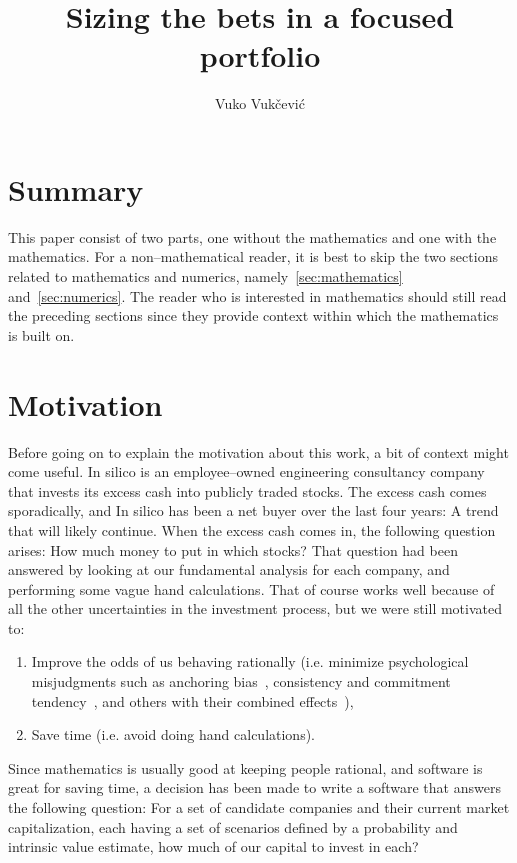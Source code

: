 \documentclass{article}
\title{Sizing the bets in a focused portfolio}
\author[$\dagger$]{Vuko Vuk\v{c}evi\'{c}}
\affil[$\dagger$]{In silico Ltd., Zagreb, Croatia, vuko.vukcevic@insilico.hr}
\begin{document}
\maketitle

\section{Summary}
\label{sec:summary}

This paper consist of two parts, one without the mathematics and one with the
mathematics. For a non--mathematical reader, it is best to skip the two sections
related to mathematics and numerics, namely~\autoref{sec:mathematics}
and~\autoref{sec:numerics}. The reader who is interested in mathematics should
still read the preceding sections since they provide context within which the
mathematics is built on.

\section{Motivation}
\label{sec:motivation}

Before going on to explain the motivation about this work, a bit of context
might come useful. In silico is an employee--owned engineering consultancy
company that invests its excess cash into publicly traded stocks. The excess
cash comes sporadically, and In silico has been a net buyer over the last four
years: A trend that will likely continue. When the excess cash comes in, the
following question arises: How much money to put in which stocks? That question
had been answered by looking at our fundamental analysis for each company, and
performing some vague hand calculations. That of course works well because of
all the other uncertainties in the investment process, but we were still
motivated to:
\begin{enumerate}
    \item Improve the odds of us behaving rationally (i.e. minimize
    psychological misjudgments such as anchoring bias~\cite{kahneman},
    consistency and commitment tendency~\cite{cialdini}, and
    others with their combined effects~\cite{almanack}),
    \item Save time (i.e. avoid doing hand calculations).
\end{enumerate}

Since mathematics is usually good at keeping people rational, and software is
great for saving time, a decision has been made to write a software that answers
the following question: For a set of candidate companies and their current
market capitalization, each having a set of scenarios defined by a probability
and intrinsic value estimate, how much of our capital to invest in each?
\end{document}
